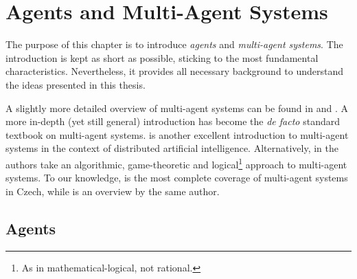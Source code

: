 
\chapter{Agents and Multi-Agent Systems}

The purpose of this chapter is to introduce \textit{agents} and \textit{multi-agent systems}.
The introduction is kept as short as possible, sticking to the most fundamental characteristics.
Nevertheless, it provides all necessary background to understand the ideas presented in this thesis.

A slightly more detailed overview of multi-agent systems can be found in \cite{Wooldridge95} and \cite{Wooldridge02}. A more in-depth (yet still general) introduction \cite{Wooldridge09} has become the \textit{de facto} standard textbook on multi-agent systems.
\cite{Weiss99} is another excellent introduction to multi-agent systems in the context of distributed artificial intelligence.
Alternatively, in \cite{Shoham08} the authors take an algorithmic, game-theoretic and logical\footnote{As in mathematical-logical, not rational.} approach to multi-agent systems.
To our knowledge, \cite{Kubik04} is the most complete coverage of multi-agent systems in Czech, while \cite{Kubik03} is an overview by the same author.

\section{Agents}

